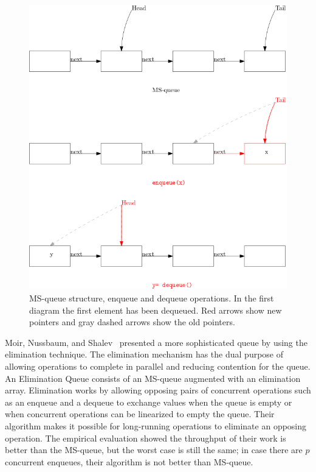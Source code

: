 \documentclass[10pt]{article}
\theoremstyle{definition}
\begin{document}
\begin{figure}[hbt]
  \center\includegraphics[scale=0.4]{pics/msqueue}
  \caption{\label{fig::msq}MS-queue structure, enqueue and dequeue operations. In the first diagram the first element has been dequeued. Red arrows show new pointers and gray dashed arrows show the old pointers.}
\end{figure}


Moir, Nussbaum, and Shalev~\cite{DBLP:conf/spaa/MoirNSS05} presented a more sophisticated queue by using the elimination technique. The elimination mechanism has the dual purpose of allowing operations to complete in parallel and reducing contention for the queue. An Elimination Queue consists of an MS-queue augmented with an elimination array. Elimination works by allowing opposing pairs of concurrent operations such as an enqueue and a dequeue to exchange values when the queue is empty or when concurrent operations can be linearized to empty the queue. Their algorithm makes it possible for long-running operations to eliminate an opposing operation. The empirical evaluation showed the throughput of their work is better than the MS-queue, but the worst case is still the same; in case there are $p$ concurrent enqueues, their algorithm is not better than MS-queue. 
\end{document}
